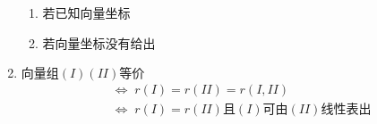 \documentclass[a4paper,12pt]{article}
\begin{document}
\begin{enumerate}
        \begin{enumerate}
            \item 若已知向量坐标 \Rightarrow {}
            \item 若向量坐标没有给出 \Rightarrow {}
        \end{enumerate}
        \item $\text{向量组}(I)(II)\text{等价}$
        \begin{align*}
            &\Leftrightarrow\; r(I) = r(II) = r(I, II) \\
            &\Leftrightarrow\; r(I) = r(II)\text{且}(I)\text{可由}(II)\text{线性表出}  \\
        \end{align*}
    \end{enumerate}
\end{document}
